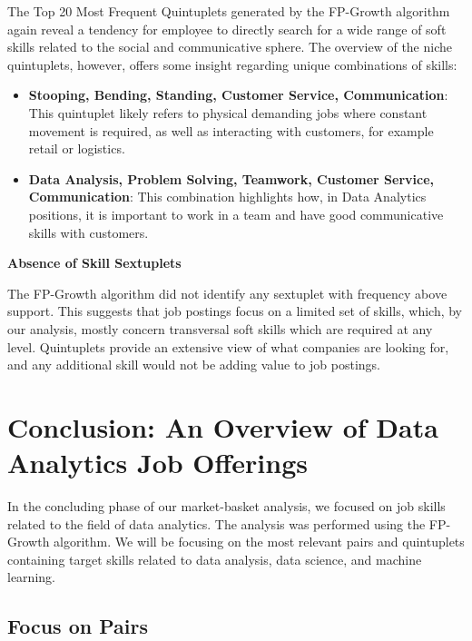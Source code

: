 \documentclass{article}
\begin{document}
\vspace{0.3cm}
The Top 20 Most Frequent Quintuplets generated by the FP-Growth algorithm again reveal a tendency for employee to directly search for a wide range of soft skills related to the social and communicative sphere. The overview of the niche quintuplets, however, offers some insight regarding unique combinations of skills:

\begin{itemize}
    \item \textbf{Stooping, Bending, Standing, Customer Service, Communication}: 
    This quintuplet likely refers to physical demanding jobs where constant movement is required, as well as interacting with customers, for example retail or logistics.

    \item \textbf{Data Analysis, Problem Solving, Teamwork, Customer Service, Communication}: 
    This combination highlights how, in Data Analytics positions, it is important to work in a team and have good communicative skills with customers.

\end{itemize}

\vspace{0.5cm}
\textbf{Absence of Skill Sextuplets}

\vspace{0.3cm}

The FP-Growth algorithm did not identify any sextuplet with frequency above support. This suggests that job postings focus on a limited set of skills, which, by our analysis, mostly concern transversal soft skills which are required at any level. Quintuplets provide an extensive view of what companies are looking for, and any additional skill would not be adding value to job postings.

\newpage
\section{Conclusion: An Overview of Data Analytics Job Offerings}

In the concluding phase of our market-basket analysis, we focused on job skills related to the field of data analytics. The analysis was performed using the FP-Growth algorithm. We will be focusing on the most relevant pairs and quintuplets containing target skills related to data analysis, data science, and machine learning.

\subsection{Focus on Pairs}
\end{document}
